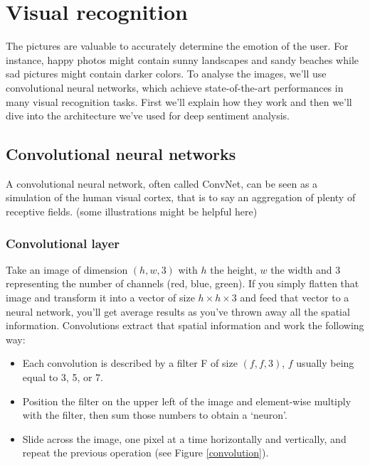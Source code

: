 \chapter{Visual recognition}
The pictures are valuable to accurately determine the emotion of the user. For instance, happy photos might contain sunny landscapes and sandy beaches while sad pictures might contain darker colors. To analyse the images, we'll use convolutional neural networks, which achieve state-of-the-art performances in many visual recognition tasks. First we'll explain how they work and then we'll dive into the architecture we've used for deep sentiment analysis.
\section{Convolutional neural networks}
A convolutional neural network, often called ConvNet, can be seen as a simulation of the human visual cortex, that is to say an aggregation of plenty of receptive fields. (some illustrations might be helpful here)

\subsection{Convolutional layer}
Take an image of dimension $(h,w,3)$ with $h$ the height, $w$ the width and 3 representing the number of channels (red, blue, green). If you simply flatten that image and transform it into a vector of size $h\times h \times 3$ and feed that vector to a neural network, you'll get average results as you've thrown away all the spatial information. Convolutions extract that spatial information and work the following way:
\begin{itemize}
    \item Each convolution is described by a filter F of size $(f, f, 3)$, $f$ usually being equal to 3, 5, or 7.
    \item Position the filter on the upper left of the image and element-wise multiply with the filter, then sum those numbers to obtain a `neuron'.
    \item Slide across the image, one pixel at a time horizontally and vertically, and repeat the previous operation (see Figure \ref{convolution}).
\end{itemize}

